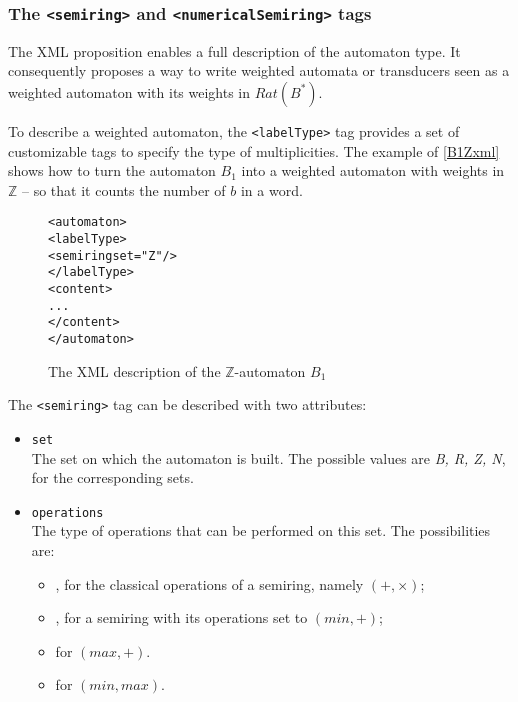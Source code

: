\documentclass[a4paper]{article}
\newcommand{\xtag}[1]{\texttt{<#1>}}
\newcommand{\xattr}[1]{\texttt{#1}}
\begin{document}
\subsubsection{The \xtag{semiring} and \xtag{numericalSemiring} tags}

The XML proposition enables a full description of the automaton type.
It consequently proposes a way to write weighted automata or
transducers seen as a weighted automaton with its weights in
$Rat(B^*)$.

To describe a weighted automaton, the \xtag{labelType} tag provides a set of
customizable tags to specify the type of multiplicities. The example
of \autoref{B1Zxml} shows how to turn the automaton $B_1$ into a
weighted automaton with weights in ${\mathbb Z}$ -- so that it counts the
number of $b$ in a word.

\begin{figure}[ht]
  \small
  \begin{center}
\begin{alltt}
<automaton>
  \xtag{labelType}
     <semiring set="Z"/>
  </labelType>
  <content>
  ...
  </content>
</automaton>
\end{alltt}

\caption{The XML description of the $\mathbb{Z}$-automaton $B_1$}
\label{B1Zxml}
  \end{center}
\end{figure}

The \xtag{semiring} tag can be described with two attributes:
\begin{itemize}
\item \xattr{set}\\
  The set on which the automaton is built. The possible values are
\textit{B, R, Z, N}, for the corresponding sets.
\item \xattr{operations}\\
  The type of operations that can be performed on this set.  The
  possibilities are:
  \begin{itemize}
  \item {}, for the classical operations of a semiring, namely
    $(+, \times)$;
  \item {}, for a semiring with its operations set to $(min, +)$;
  \item {} for $(max, +)$.
  \item {} for $(min, max)$.
  \end{itemize}
\end{itemize}
\end{document}
